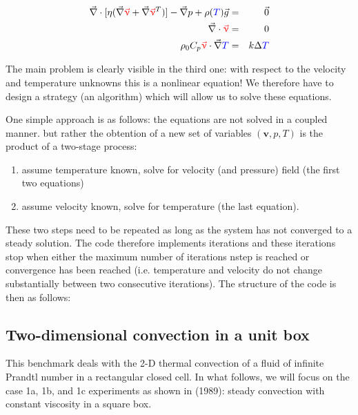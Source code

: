 \begin{eqnarray}
{\vec \nabla}\cdot [\eta ({\vec\nabla} {\color{red}{\vec \upnu}} 
+ {\vec \nabla} {\color{red}{\vec \upnu}}^T ) ] 
- {\vec \nabla}p + \rho({\color{blue}T}) {\vec g} &=& {\vec 0}   \\
{\vec \nabla}\cdot {\color{red} {\vec \upnu}} &=& 0 \\
\rho_0 C_p {\color{red} {\vec \upnu}}\cdot {\vec \nabla} {\color{blue}T} &=& k \Delta {\color{blue}T} 
\end{eqnarray} 

The main problem is clearly visible in the third one: with respect to the velocity and 
temperature unknowns this is a nonlinear equation! 
We therefore have to design a strategy (an algorithm) which will allow us to solve these 
equations. 

One simple approach is as follows: the equations are not solved in a coupled manner. 
but rather the obtention of a new set of variables $({\bm v},p,T)$ is the product of a two-stage process:
\begin{enumerate}
\item assume temperature known, solve for velocity (and pressure) field (the first two equations)
\item assume velocity known, solve for temperature (the last equation).
\end{enumerate}

These two steps need to be repeated as long as the system has not converged to a steady solution. 
The code therefore implements iterations and these iterations stop when either the maximum number 
of iterations nstep is reached or convergence has been reached (i.e. temperature and velocity 
do not change substantially between two consecutive iterations). The structure of the code 
is then as follows:






\subsection{Two-dimensional convection in a unit box}

This benchmark deals with the 2-D thermal convection of a fluid 
of infinite Prandtl number in a rectangular closed cell.
In what follows, we will focus on the case 1a, 1b, and 1c experiments as shown 
in \textcite{blbc89} (1989):
steady convection with constant viscosity in a square box.

